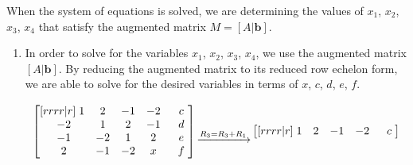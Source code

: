 \documentclass[a4paper]{article}
\begin{document}
\begin{enumerate}[label=\textbf{\arabic*.}]
			When the system of equations is solved, we are determining the values of $x_1$, $x_2$, $x_3$, $x_4$ that satisfy the augmented matrix $M = [A|\textbf{b}]$.

			\begin{enumerate}

				\item In order to solve for the variables $x_1$, $x_2$, $x_3$, $x_4$, we use the augmented matrix $[A|\textbf{b}]$. By reducing the augmented matrix to its reduced row echelon form, we are able to solve for the desired variables in terms of $x$, $c$, $d$, $e$, $f$.

				$$
				\begin{bmatrix}[rrrr|r]
					\hspace{1mm} 1 & 2 & -1 & -2 \hspace{1mm} & \hspace{1mm} c \hspace{1mm}\\
					\hspace{1mm}-2 & 1 & 2 & -1 \hspace{1mm} & \hspace{1mm} d \hspace{1mm}\\
					\hspace{1mm} -1 & -2 & 1 & 2 \hspace{1mm} & \hspace{1mm} e \hspace{1mm}\\
					\hspace{1mm} 2 & -1 & -2 & x \hspace{1mm} & \hspace{1mm} f \hspace{1mm}\\
				\end{bmatrix}
				\begin{matrix}
					~\\
					~\\
					\xrightarrow{R_3 = R_3 + R_1} \\
					~\\
				\end{matrix}
				\begin{bmatrix}[rrrr|r]
					\hspace{1mm} 1 & 2 & -1 & -2 \hspace{1mm} & \hspace{1mm} c \hspace{1mm}\\

\end{bmatrix}$$
\end{enumerate}
\end{enumerate}
\end{document}
